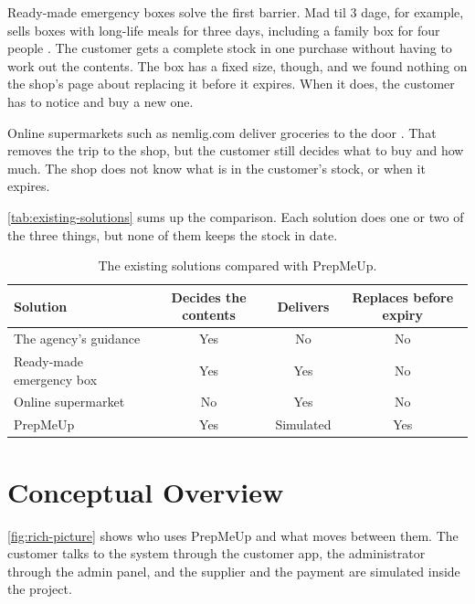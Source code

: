 Ready-made emergency boxes solve the first barrier. Mad til 3 dage, for example, sells
boxes with long-life meals for three days, including a family box for four people
\cite{madtil3dage-shop}. The customer gets a complete stock in one purchase without
having to work out the contents. The box has a fixed size, though, and we found nothing
on the shop's page about replacing it before it expires. When it does, the customer has
to notice and buy a new one.

Online supermarkets such as nemlig.com deliver groceries to the door
\cite{nemlig-online-supermarket}. That removes the trip to the shop, but the customer
still decides what to buy and how much. The shop does not know what is in the
customer's stock, or when it expires.

\autoref{tab:existing-solutions} sums up the comparison. Each solution does one or two of
the three things, but none of them keeps the stock in date.

\begin{table}[H]
    \centering
    \begin{tabular}{@{}lccc@{}}
        \hline
        Solution & Decides the contents & Delivers & Replaces before expiry \\
        \hline
        The agency's guidance & Yes & No & No \\
        Ready-made emergency box & Yes & Yes & No \\
        Online supermarket & No & Yes & No \\
        PrepMeUp & Yes & Simulated & Yes \\
        \hline
    \end{tabular}
    \caption{The existing solutions compared with PrepMeUp.}
    \label{tab:existing-solutions}
\end{table}

\section{Conceptual Overview}\label{sec:conceptual-overview}
\autoref{fig:rich-picture} shows who uses PrepMeUp and what moves between them.
The customer talks to the system through the customer app, the administrator
through the admin panel, and the supplier and the payment are simulated
inside the project.


